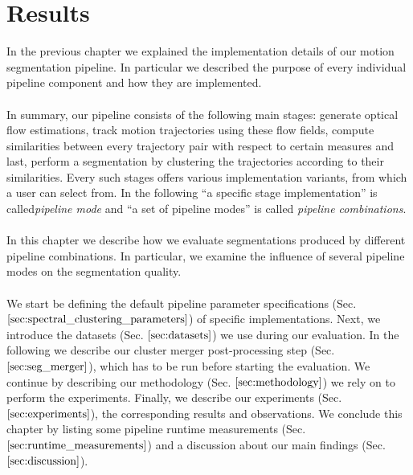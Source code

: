 \chapter{Results}
In the previous chapter we explained the implementation details of our motion segmentation pipeline. In particular we described the purpose of every individual pipeline component and how they are implemented. \\ \\
In summary, our pipeline consists of the following main stages: generate optical flow estimations, track motion trajectories using these flow fields, compute similarities between every trajectory pair with respect to certain measures and last, perform a segmentation by clustering the trajectories according to their similarities. Every such stages offers various implementation variants, from which a user can select from.  
In the following \enquote{a specific stage implementation} is called\textit{pipeline mode} and \enquote{a set of pipeline modes} is called \textit{pipeline combinations}. \\ \\
In this chapter we describe how we evaluate segmentations produced by different pipeline combinations. In particular, we examine the influence of several pipeline modes on the segmentation quality. \\ \\
We start be defining the default pipeline parameter specifications (Sec. $\ref{sec:spectral_clustering_parameters}$) of specific implementations. Next, we introduce the datasets (Sec. $\ref{sec:datasets}$) we use during our evaluation. In the following we describe our cluster merger post-processing step (Sec. $\ref{sec:seg_merger}$), which has to be run before starting the evaluation. We continue by describing our methodology (Sec. $\ref{sec:methodology}$) we rely on to perform the experiments. Finally, we describe our experiments (Sec. $\ref{sec:experiments}$), the corresponding results and observations. We conclude this chapter by listing some pipeline runtime measurements (Sec. $\ref{sec:runtime_measurements}$) and a discussion about our main findings (Sec. $\ref{sec:discussion}$). 

